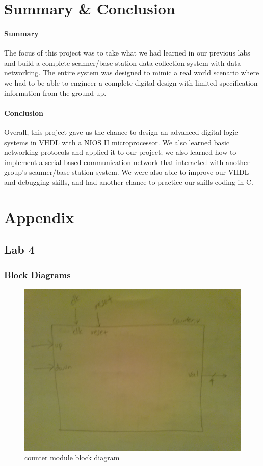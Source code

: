 \documentclass{article}
\begin{document}
\section{Summary \& Conclusion}
  \paragraph{Summary} The focus of this project was to take what we had learned in our previous labs and build a complete scanner/base station data collection system with data networking. The entire system was designed to mimic a real world scenario where we had to be able to engineer a complete digital design with limited specification information from the ground up.  

  \paragraph{Conclusion} Overall, this project gave us the chance to design an advanced digital logic systems in VHDL with a NIOS II microprocessor. We also learned basic networking protocols and applied it to our project; we also learned how to implement a serial based communication network that interacted with another group’s scanner/base station system. We were also able to improve our VHDL and debugging skills, and had another chance to practice our skills coding in C.


\section{Appendix}
  \subsection{Lab 4}
    \subsubsection{Block Diagrams}
      \begin{figure}[H]
        \centering
        \includegraphics[width=0.75\linewidth]{figures/block_diagrams/counter.jpg}
        \caption{counter module block diagram}
        \label{fig:counter_blockdiagram}
      \end{figure}
\end{document}
